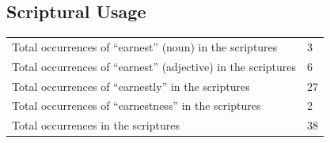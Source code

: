 	

	


\subsection{Scriptural Usage} %
	\label{EARNEST-SCRIPTURES}
	
	\begin{tabular}{ll}
		Total occurrences of ``earnest'' (noun) in the scriptures & 3 \\
		Total occurrences of ``earnest'' (adjective) in the scriptures & 6 \\
		Total occurrences of ``earnestly'' in the scriptures & 27 \\
		Total occurrences of ``earnestness'' in the scriptures & 2 \\
		Total occurrences in the scriptures & 38 \\
	\end{tabular}

	

